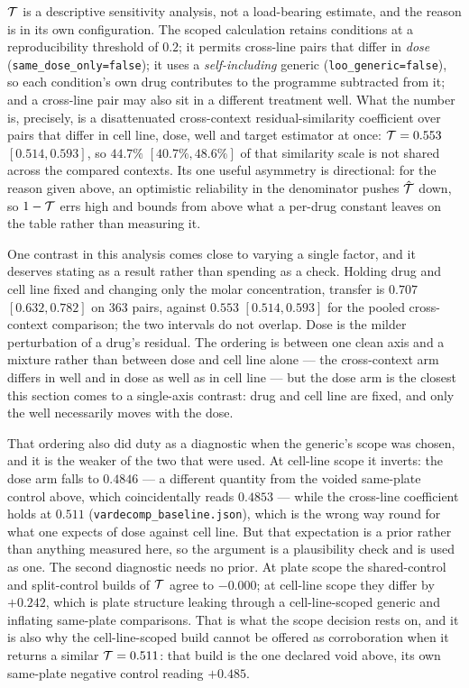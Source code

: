 $\mathcal{T}$ is a descriptive sensitivity analysis, not a load-bearing estimate, and the reason is in
its own configuration. The scoped calculation retains conditions at a reproducibility threshold of
$0.2$; it permits cross-line pairs that differ in \emph{dose} (\texttt{same\_dose\_only=false}); it
uses a \emph{self-including} generic (\texttt{loo\_generic=false}), so each condition's own drug
contributes to the programme subtracted from it; and a cross-line pair may also sit in a different
treatment well. What the number is, precisely, is a disattenuated cross-context residual-similarity
coefficient over pairs that differ in cell line, dose, well and target estimator at once:
$\mathcal{T} = 0.553$ \nolinebreak[3]$[0.514, 0.593]$, so $44.7\%$ $[40.7\%, 48.6\%]$ of that similarity
scale is not shared across the compared contexts. Its one useful asymmetry is directional: for the reason
given above, an optimistic reliability in the denominator pushes $\hat{\mathcal{T}}$ down, so
$1 - \mathcal{T}$ errs high and bounds from above what a per-drug constant leaves on the table rather
than measuring it.

One contrast in this analysis comes close to varying a single factor, and it deserves stating as a
result rather than spending as a check. Holding drug and cell line fixed and changing only the molar
concentration, transfer is $0.707$ $[0.632, 0.782]$ on $363$ pairs, against $0.553$ $[0.514, 0.593]$
for the pooled cross-context comparison; the two intervals do not overlap. Dose is the milder
perturbation of a drug's residual. The ordering is between one clean axis and a mixture rather than
between dose and cell line alone --- the cross-context arm differs in well and in dose as well as in
cell line --- but the dose arm is the closest this section comes to a single-axis contrast: drug and cell line
are fixed, and only the well necessarily moves with the dose.

That ordering also did duty as a diagnostic when the generic's scope was chosen, and it is the
weaker of the two that were used. At cell-line scope it inverts: the dose arm falls to $0.4846$ ---
a different quantity from the voided same-plate control above, which coincidentally reads $0.4853$
--- while the cross-line coefficient holds at $0.511$ (\texttt{vardecomp\_baseline.json}), which is the wrong
way round for what one expects of dose against cell line. But that expectation is a prior rather
than anything measured here, so the argument is a plausibility check and is used as one. The second
diagnostic needs no prior. At plate scope the shared-control and split-control builds of $\mathcal{T}$
agree to $-0.000$; at cell-line scope they differ by $+0.242$, which is plate structure leaking
through a cell-line-scoped generic and inflating same-plate comparisons. That is what the scope
decision rests on, and it is also why the cell-line-scoped build cannot be offered as corroboration
when it returns a similar $\mathcal{T} = 0.511$: that build is the one declared void above, its own
same-plate negative control reading $+0.485$.


